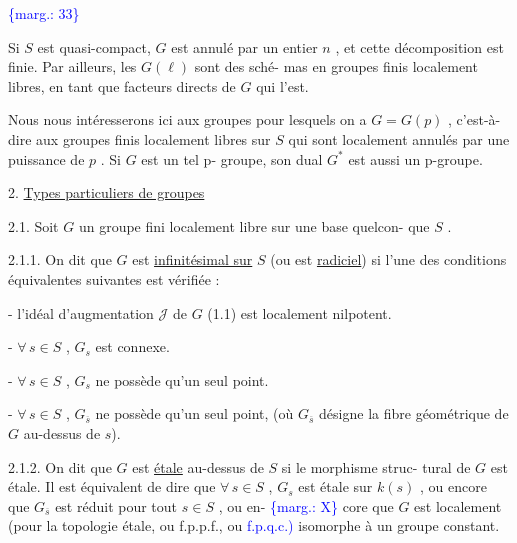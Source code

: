 \documentclass[11pt]{article}
\newcommand{\scanpage}[1]{\par\bigskip\noindent{\small\sffamily[scan #1]}\par}
\newcommand{\mspage}[1]{{\small\sffamily[p.\,#1]}}
\newcommand{\hand}[1]{\textcolor{blue}{#1}}
\newcommand{\margin}[1]{\textcolor{blue}{\{\textsf{marg.:} #1\}}}
\newcommand{\uline}[1]{\underline{#1}}
\begin{document}
\margin{33}

\clearpage
\scanpage{129/34}
\mspage{II.6}

Si $S$ est quasi-compact, $G$ est annulé par un entier $n$ ,
et cette décomposition est finie. Par ailleurs, les $G(\ell)$ sont des sché-%
mas en groupes finis localement libres, en tant que facteurs directs de
$G$ qui l'est.

Nous nous intéresserons ici aux groupes pour lesquels on a
$G = G(p)$ , c'est-à-dire aux groupes finis localement libres sur $S$ qui
sont localement annulés par une puissance de $p$ . Si $G$ est un tel p-%
groupe, son dual $G^*$ est aussi un p-groupe.

2. \uline{Types particuliers de groupes}

2.1. Soit $G$ un groupe fini localement libre sur une base quelcon-%
que $S$ .

2.1.1. On dit que $G$ est \uline{infinitésimal sur} $S$ (ou est \uline{radiciel}) si
l'une des conditions équivalentes suivantes est vérifiée :

- l'idéal d'augmentation $\mathcal{J}$ de $G$ (1.1) est localement nilpotent.

- $\forall\, s \in S$ , $G_s$ est connexe.

- $\forall\, s \in S$ , $G_s$ ne possède qu'un seul point.

- $\forall\, s \in S$ , $G_{\overline{s}}$ ne possède qu'un seul point, (où $G_{\overline{s}}$ désigne
la fibre géométrique de $G$ au-dessus de $s$).

2.1.2. On dit que $G$ est \uline{étale} au-dessus de $S$ si le morphisme struc-%
tural de $G$ est étale. Il est équivalent de dire que $\forall\, s \in S$ , $G_s$ est
étale sur $k(s)$ , ou encore que $G_{\overline{s}}$ est réduit pour tout $s \in S$ , ou en-%
\margin{X} core que $G$ est localement (pour la topologie étale, ou f.p.p.f., ou \hand{f.p.q.c.)}
isomorphe à un groupe constant.

\mspage{34}

\clearpage
\scanpage{129/35}
\mspage{\hand{II.7}}
\end{document}
